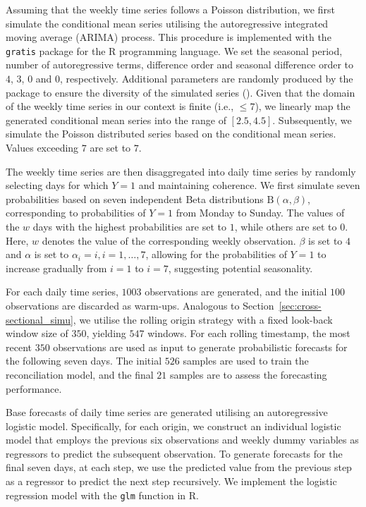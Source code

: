 \documentclass[a4paper,review,12pt,authoryear]{elsarticle}
\let\code=\texttt
\let\proglang=\textsf
\theoremstyle{definition}
\begin{document}
     Assuming that the weekly time series follows a Poisson distribution, we first simulate the conditional mean series utilising the autoregressive integrated moving average (ARIMA) process. This procedure is implemented with the \code{gratis} package \citep{gratis}
     for the \proglang{R} programming language. We set the seasonal period, number of autoregressive terms, difference order and seasonal difference order to $4$, $3$, $0$ and $0$, respectively. 
     Additional parameters are randomly produced by the package to ensure the diversity of the simulated series ().
     Given that the domain of the weekly time series in our context is finite (i.e., $\leq 7$), we linearly map the generated conditional mean series into the range of $[2.5, 4.5]$.
     Subsequently, we simulate the Poisson distributed series based on the conditional mean series. Values exceeding $7$ are set to $7$.

     The weekly time series are then disaggregated into daily time series by randomly selecting days for which $Y=1$ and maintaining coherence.
     We first simulate seven probabilities based on seven independent Beta distributions $\textrm{B}(\alpha, \beta)$, corresponding to probabilities of $Y=1$ from Monday to Sunday.
     The values of the $w$ days with the highest probabilities are set to $1$, while others are set to $0$. Here, $w$ denotes the value of the corresponding weekly observation.
     $\beta$ is set to $4$ and $\alpha$ is set to $\alpha_i = i, i=1,\dots,7$, allowing for the probabilities of $Y=1$ to increase gradually from $i=1$ to $i=7$, suggesting potential seasonality.

     For each daily time series, $1003$ observations are generated, and the initial $100$ observations are discarded as warm-ups. Analogous to Section~\ref{sec:cross-sectional_simu}, we utilise the rolling origin strategy with a fixed look-back window size of $350$, yielding $547$ windows.
     For each rolling timestamp, the most recent $350$ observations are used as input to generate probabilistic forecasts for the following seven days.
     The initial $526$ samples are used to train the reconciliation model, and the final $21$ samples are to assess the forecasting performance.

     Base forecasts of daily time series are generated utilising an autoregressive logistic model.
     Specifically, for each origin, we construct an individual logistic model that employs the previous six observations and weekly dummy variables as regressors to predict the subsequent observation.
     To generate forecasts for the final seven days, at each step, we use the predicted value from the previous step as a regressor to predict the next step recursively.
     We implement the logistic regression model with the \code{glm} function in \proglang{R}.
\end{document}
